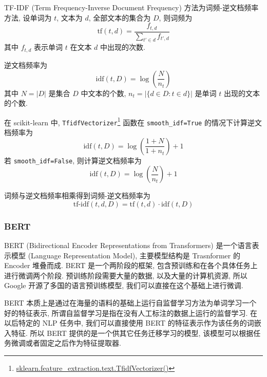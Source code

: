 \documentclass[12pt]{article}
\begin{document}
TF-IDF (Term Frequency-Inverse Document Frequency) \cite{Rajaraman2011Data} 方法为词频-逆文档频率方法, 设单词为 $t$, 文本为 $d$, 全部文本的集合为 $D$, 则词频为
\begin{equation}
  \mathrm{tf}(t,d) = \frac{f_{t,d}}{\sum_{t'\in d}f_{t',d}}
\end{equation}
其中 $f_{t,d}$ 表示单词 $t$ 在文本 $d$ 中出现的次数.

逆文档频率为
\begin{equation}
  \mathrm{idf}(t,D) = \log\left(\frac{N}{n_t}\right)
\end{equation}
其中 $N=|D|$ 是集合 $D$ 中文本的个数, $n_t=|\{d\in D:t\in d\}|$ 是单词 $t$ 出现的文本的个数.

在 scikit-learn 中, \verb|TfidfVectorizer|\footnote{\href{https://scikit-learn.org/stable/modules/generated/sklearn.feature_extraction.text.TfidfVectorizer.html}{sklearn.feature\_extraction.text.TfidfVectorizer()}} 函数在 \verb|smooth_idf=True| 的情况下计算逆文档频率为
\begin{equation}
  \mathrm{idf}(t,D) = \log\left(\frac{1+N}{1+n_t}\right)+1
\end{equation}
若 \verb|smooth_idf=False|, 则计算逆文档频率为
\begin{equation}
  \mathrm{idf}(t,D) = \log\left(\frac{N}{n_t}\right)+1
\end{equation}

词频与逆文档频率相乘得到词频-逆文档频率为
\begin{equation}
  \text{tf-idf}(t,d,D) = \mathrm{tf}(t,d)\cdot\mathrm{idf}(t,D)
\end{equation}

\subsubsection{BERT}


BERT (Bidirectional Encoder Representations from Transformers) \cite{Devlin2018BERT} 是一个语言表示模型 (Language Representation Model), 主要模型结构是 Trasnformer 的 Encoder 堆叠而成. BERT 是一个两阶段的框架, 包含预训练和在各个具体任务上进行微调两个阶段. 预训练阶段需要大量的数据, 以及大量的计算机资源, 所以 Google 开源了多国的语言预训练模型, 我们可以直接在这个基础上进行微调. 

BERT 本质上是通过在海量的语料的基础上运行自监督学习方法为单词学习一个好的特征表示, 所谓自监督学习是指在没有人工标注的数据上运行的监督学习. 在以后特定的 NLP 任务中, 我们可以直接使用 BERT 的特征表示作为该任务的词嵌入特征. 所以 BERT 提供的是一个供其它任务迁移学习的模型, 该模型可以根据任务微调或者固定之后作为特征提取器. 
\end{document}
